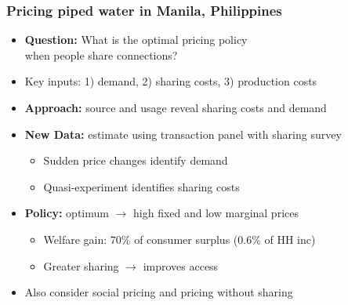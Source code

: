 \documentclass[aspectratio=149]{beamer}
\begin{document}
\begin{frame}
\frametitle{Pricing piped water in Manila, Philippines}
\begin{itemize}
\item \textbf{Question:} What is the optimal pricing policy \\
\hspace{2.4cm} when people share connections?
\vspace{.2cm}
  \item Key inputs: 1) demand, 2) sharing costs, 3) production costs

\vspace{.3cm}

  \item \textbf{Approach:} source and usage reveal sharing costs and demand
\vspace{.3cm}
  \item \textbf{New Data:} estimate using transaction panel with sharing survey
      \vspace{.1cm}
    \begin{itemize}
      \item Sudden price changes identify demand
      \item Quasi-experiment identifies sharing costs
    \end{itemize}
\vspace{.3cm}
  \item  \textbf{Policy:} optimum $\rightarrow$ high fixed and low marginal prices
      \vspace{.1cm}
    \begin{itemize}
      \item Welfare gain: 70\unskip\% of consumer surplus (0.6\unskip\% of HH inc)
        \vspace{.05cm}
      \item Greater sharing $\rightarrow$ improves access
    \end{itemize}
    \vspace{.2cm}
  \item Also consider social pricing and pricing without sharing  
\end{itemize}
\end{frame}
\end{document}
